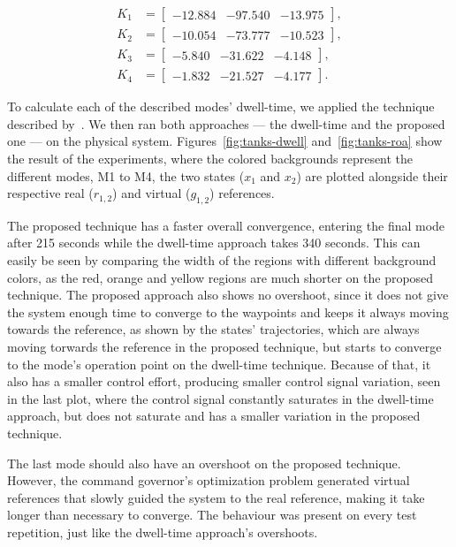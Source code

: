 \begin{align}
  K_{1} & = \begin{bmatrix} -12.884 & -97.540 & -13.975 \end{bmatrix}, \\
  K_{2} & = \begin{bmatrix} -10.054 & -73.777 & -10.523 \end{bmatrix}, \\
  K_{3} & = \begin{bmatrix} -5.840  & -31.622 & -4.148 \end{bmatrix}, \\
  K_{4} & = \begin{bmatrix} -1.832  & -21.527 & -4.177 \end{bmatrix}.
\end{align}

To calculate each of the described modes' dwell-time, we applied the technique
described by~\textcite{franzè.lucia.ea:command}. We then ran both approaches ---
the dwell-time and the proposed one --- on the physical system.
Figures~\ref{fig:tanks-dwell} and~\ref{fig:tanks-roa} show the result of the
experiments, where the colored backgrounds represent the different modes, M1 to
M4, the two states (\(x_{1}\) and \(x_{2}\)) are plotted alongside their
respective real (\(r_{1,2}\)) and virtual (\(g_{1,2}\)) references.

The proposed technique has a faster overall convergence, entering the final mode
after 215 seconds while the dwell-time approach takes 340 seconds. This can
easily be seen by comparing the width of the regions with different background
colors, as the red, orange and yellow regions are much shorter on the proposed
technique. The proposed approach also shows no overshoot, since it does not give
the system enough time to converge to the waypoints and keeps it always moving
towards the reference, as shown by the states' trajectories, which are always
moving torwards the reference in the proposed technique, but starts to converge
to the mode's operation point on the dwell-time technique. Because of that, it
also has a smaller control effort, producing smaller control signal variation,
seen in the last plot, where the control signal constantly saturates in the
dwell-time approach, but does not saturate and has a smaller variation in the
proposed technique.

The last mode should also have an overshoot on the proposed technique. However,
the command governor's optimization problem generated virtual references that
slowly guided the system to the real reference, making it take longer than
necessary to converge. The behaviour was present on every test repetition, just
like the dwell-time approach's overshoots.

